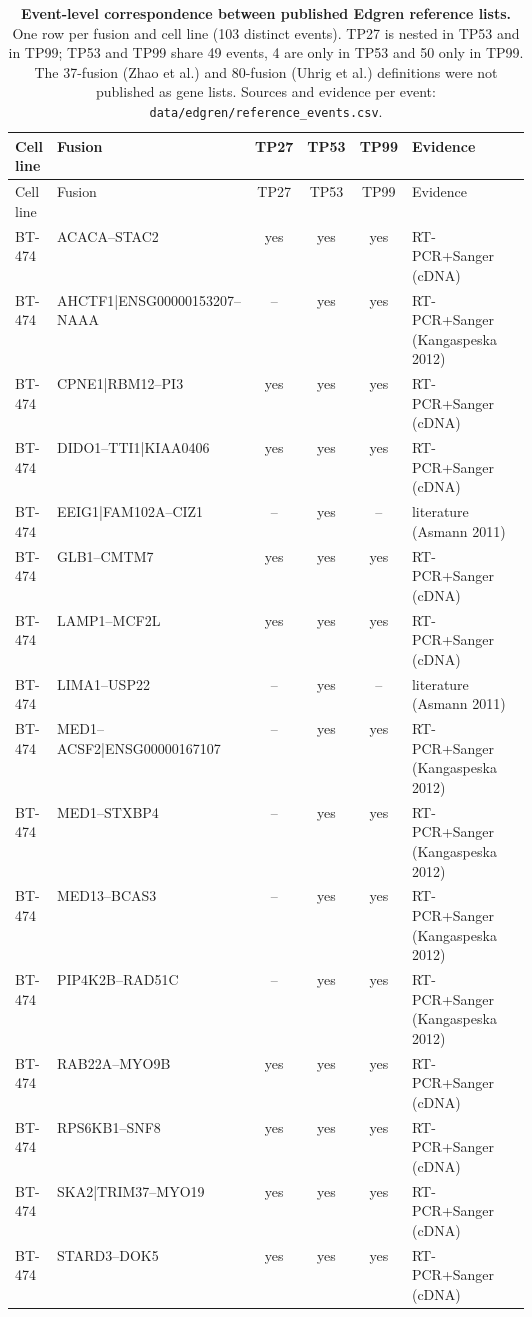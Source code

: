 {\scriptsize
\begin{longtable}{lp{0.30\linewidth}cccp{0.30\linewidth}}
\caption{\textbf{Event-level correspondence between published Edgren reference lists.} One row per fusion and cell line (103 distinct events). TP27 is nested in TP53 and in TP99; TP53 and TP99 share 49 events, 4 are only in TP53 and 50 only in TP99. The 37-fusion (Zhao et al.) and 80-fusion (Uhrig et al.) definitions were not published as gene lists. Sources and evidence per event: \texttt{data/edgren/reference\_events.csv}.}\label{tab:supp_edgren_events}\\
\toprule
Cell line & Fusion & TP27 & TP53 & TP99 & Evidence \\
\midrule
\endfirsthead
\toprule
Cell line & Fusion & TP27 & TP53 & TP99 & Evidence \\
\midrule
\endhead
BT-474 & ACACA--STAC2 & yes & yes & yes & RT-PCR+Sanger (cDNA) \\
BT-474 & AHCTF1|ENSG00000153207--NAAA & -- & yes & yes & RT-PCR+Sanger (Kangaspeska 2012) \\
BT-474 & CPNE1|RBM12--PI3 & yes & yes & yes & RT-PCR+Sanger (cDNA) \\
BT-474 & DIDO1--TTI1|KIAA0406 & yes & yes & yes & RT-PCR+Sanger (cDNA) \\
BT-474 & EEIG1|FAM102A--CIZ1 & -- & yes & -- & literature (Asmann 2011) \\
BT-474 & GLB1--CMTM7 & yes & yes & yes & RT-PCR+Sanger (cDNA) \\
BT-474 & LAMP1--MCF2L & yes & yes & yes & RT-PCR+Sanger (cDNA) \\
BT-474 & LIMA1--USP22 & -- & yes & -- & literature (Asmann 2011) \\
BT-474 & MED1--ACSF2|ENSG00000167107 & -- & yes & yes & RT-PCR+Sanger (Kangaspeska 2012) \\
BT-474 & MED1--STXBP4 & -- & yes & yes & RT-PCR+Sanger (Kangaspeska 2012) \\
BT-474 & MED13--BCAS3 & -- & yes & yes & RT-PCR+Sanger (Kangaspeska 2012) \\
BT-474 & PIP4K2B--RAD51C & -- & yes & yes & RT-PCR+Sanger (Kangaspeska 2012) \\
BT-474 & RAB22A--MYO9B & yes & yes & yes & RT-PCR+Sanger (cDNA) \\
BT-474 & RPS6KB1--SNF8 & yes & yes & yes & RT-PCR+Sanger (cDNA) \\
BT-474 & SKA2|TRIM37--MYO19 & yes & yes & yes & RT-PCR+Sanger (cDNA) \\
BT-474 & STARD3--DOK5 & yes & yes & yes & RT-PCR+Sanger (cDNA) \\

\end{longtable}}
